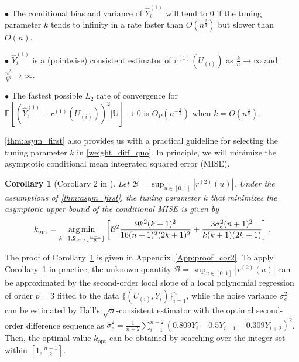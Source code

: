 \documentclass{uwstat572}
\newtheorem{cor}[theorem]{Corollary}
\theoremstyle{definition}
\DeclareMathOperator*{\argmin}{arg\,min}
\DeclarePairedDelimiter\floor{\lfloor}{\rfloor}
\renewcommand{\hat}{\widehat}
\theoremstyle{theorem}
\begin{document}
$\bullet$ The conditional bias and variance of $\hat{Y}_i^{(1)}$ will tend to 0 if the tuning parameter $k$ tends to infinity in a rate faster than $O\left(n^{\frac{2}{3}}\right)$ but slower than $O\left(n \right)$.
	
$\bullet$ $\hat{Y}_i^{(1)}$ is a (pointwise) consistent estimator of $r^{(1)}(U_{(i)})$ as $\frac{k}{n} \to \infty$ and $\frac{n^2}{k^3}\to \infty$.
	
$\bullet$ The fastest possible $L_2$ rate of convergence for $\mathbb{E}\left[\left(\hat{Y}_i^{(1)} - r^{(1)}(U_{(i)})\right)^2 \big| \mathbb{U}\right] \to 0$ is $O_P\left(n^{-\frac{2}{5}}\right)$ when $k=O\left(n^{\frac{4}{5}}\right)$.

\autoref{thm:asym_first} also provides us with a practical guideline for selecting the tuning parameter $k$ in \eqref{weight_diff_quo}. In principle, we will minimize the asymptotic conditional mean integrated squared error (MISE).

\begin{cor}[Corollary 2 in \citealt{liu2020smoothed}]
\label{cor:k_sel}
Let $\mathcal{B} = \sup_{u\in [0,1]} \left|r^{(2)}(u)\right|$. Under the assumptions of \autoref{thm:asym_first}, the tuning parameter $k$ that minimizes the asymptotic upper bound of the conditional MISE is given by
$$k_{\text{opt}} = \argmin_{k=1,2,...,\floor{\frac{n-1}{2}}} \left[\mathcal{B}^2\frac{9k^2(k+1)^2}{16(n+1)^2(2k+1)^2} + \frac{3\sigma_e^2 (n+1)^2}{k(k+1)(2k+1)} \right].$$
\end{cor}

\noindent The proof of Corollary~\ref{cor:k_sel} is given in Appendix~\ref{App:proof_cor2}. To apply Corollary~\ref{cor:k_sel} in practice, the unknown quantity $\mathcal{B} = \sup_{u\in [0,1]} \left|r^{(2)}(u)\right|$ can be approximated by the second-order local slope of a local polynomial regression of order $p=3$ fitted to the data $\{(U_{(i)}, Y_i)\}_{i=1}^n$, while the noise variance $\sigma_e^2$ can be estimated by Hall's $\sqrt{n}$-consistent estimator with the optimal second-order difference sequence \citep{hall1990asymptotically} as $\hat{\sigma}_e^2 = \frac{1}{n-2} \sum_{i=1}^{n-2} \left(0.809Y_i - 0.5Y_{i+1} - 0.309Y_{i+2}\right)^2$. Then, the optimal value $k_{\text{opt}}$ can be obtained by searching over the integer set within $\left[1, \frac{n-1}{2}\right]$.
\end{document}

